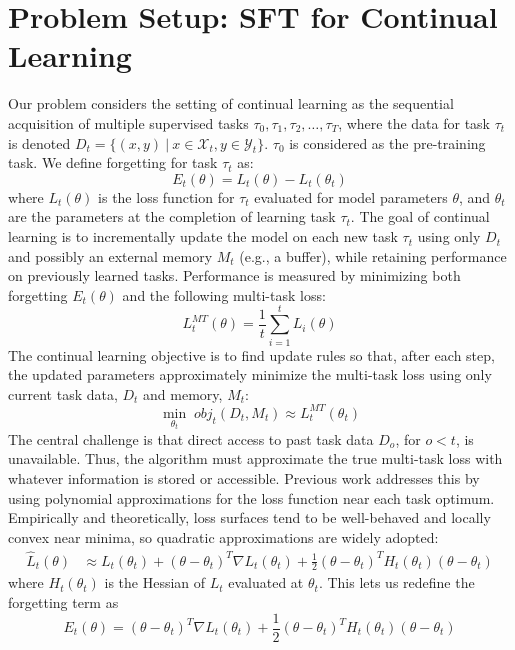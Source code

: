 \section{Problem Setup: SFT for Continual Learning}
\label{sec:problem_setup}

Our problem considers the setting of continual learning as the sequential acquisition of multiple supervised tasks $\tau_0,\tau_1, \tau_2, \ldots, \tau_T$, where the data for task $\tau_t$ is denoted $D_t = \{(x, y)\ |\ x \in \mathcal{X}_t, y \in \mathcal{Y}_t\}$. $\tau_0$ is considered as the pre-training task. We define forgetting for task $\tau_t$ as:
\begin{equation}
    E_t(\theta) = L_t(\theta) - L_t(\theta_t)
\end{equation}
where $L_t(\theta)$ is the loss function for $\tau_t$ evaluated for model parameters $\theta$, and $\theta_t$ are the parameters at the completion of learning task $\tau_t$.
The goal of continual learning is to incrementally update the model on each new task $\tau_t$ using only $D_t$ and possibly an external memory $M_t$ (e.g., a buffer), while retaining performance on previously learned tasks. Performance is measured by minimizing both forgetting $E_t(\theta)$ and the following multi-task loss:
\begin{equation}
    L_t^{MT}(\theta) = \frac{1}{t} \sum_{i=1}^t L_i(\theta)
\end{equation}
The continual learning objective is to find update rules so that, after each step, the updated parameters approximately minimize the multi-task loss using only current task data, $D_t$ and memory, $M_t$:
\begin{equation}
    \min_{\theta_t} \; obj_t(D_t, M_t) \approx L_t^{MT}(\theta_t)
\end{equation}
The central challenge is that direct access to past task data $D_o$, for $o < t$, is unavailable. Thus, the algorithm must approximate the true multi-task loss with whatever information is stored or accessible. Previous work addresses this by using polynomial approximations for the loss function near each task optimum. Empirically and theoretically, loss surfaces tend to be well-behaved and locally convex near minima, so quadratic approximations are widely adopted:
\begin{align}
    \hat{L}_t(\theta) &\approx L_t(\theta_t) + (\theta - \theta_t)^T \nabla L_t(\theta_t) + \frac{1}{2} (\theta - \theta_t)^T H_t(\theta_t) (\theta - \theta_t)
\end{align}
where $H_t(\theta_t)$ is the Hessian of $L_t$ evaluated at $\theta_t$. This lets us redefine the forgetting term as
\begin{equation}
    E_t(\theta) = (\theta - \theta_t)^T \nabla L_t(\theta_t) + \frac{1}{2} (\theta - \theta_t)^T H_t(\theta_t) (\theta - \theta_t)
\end{equation}

